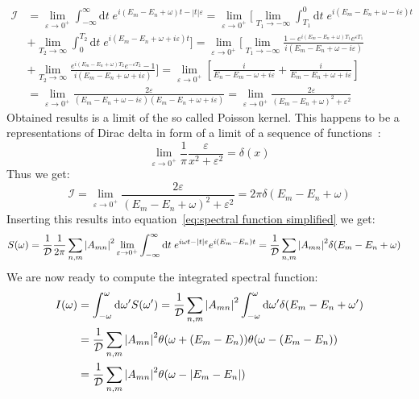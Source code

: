 \begin{align}
    \mathcal{I} &= \lim _{\varepsilon \to 0^+} \int_{-\infty}^{\infty} \mathrm{d} t \; 
    e^{ i (E_m-E_n+\omega)t -|t| \varepsilon} = \lim _{\varepsilon \to 0^+} 
    \Bigg[\lim_{T_1\to -\infty}\int_{T_1}^{0} \mathrm{d} t \; e^{ i (E_m-E_n+\omega -i \varepsilon)t}\nonumber\\
    &+\lim_{T_2\to \infty}\int_{0}^{T_2} \mathrm{d} t \;  e^{ i (E_m-E_n+\omega + i\varepsilon)t}\Bigg]
    = \lim _{\varepsilon \to 0^+} \Bigg[\lim_{T_1\to -\infty} 
    \frac{1-e^{ i (E_m-E_n+\omega )T_1} e^{\varepsilon T_1}}{i (E_m-E_n+\omega -i \varepsilon)}\nonumber\\
     &+ \lim_{T_2\to \infty} \frac{e^{ i (E_m-E_n+\omega )T_2} e^{-\varepsilon T_2}-1}
    {i (E_m-E_n+\omega +i \varepsilon)}\Bigg]
    = \lim _{\varepsilon \to 0^+} \left[\frac{i}{E_n-E_m-\omega +i \varepsilon} + 
    \frac{i}{E_m-E_n+\omega +i \varepsilon} \right]\nonumber\\
     &= \lim _{\varepsilon \to 0^+}
    \frac{2\varepsilon}{(E_m-E_n+\omega -i \varepsilon)(E_m-E_n+\omega +i \varepsilon)}
    =\lim _{\varepsilon \to 0^+} \frac{2\varepsilon}{(E_m-E_n+\omega)^2 +\varepsilon^2}
\end{align}
Obtained results is a limit of the so called Poisson kernel. This happens to be
a representations of Dirac delta in form of a limit of a sequence of functions~\autocite{byron1992mathematics}:
\begin{equation}
    \lim _{\varepsilon \to 0^+} \frac{1}{\pi} \frac{\varepsilon}{x^2 +\varepsilon^2} = \delta(x) 
\end{equation}
Thus we get:
\begin{equation}
    \mathcal{I} = \lim _{\varepsilon \to 0^+} \frac{2\varepsilon}{(E_m-E_n+\omega)^2 +\varepsilon^2}
    = 2\pi \delta(E_m-E_n+\omega)
\end{equation}
Inserting this results into equation~\eqref{eq:spectral function simplified} we get:
\begin{align}
    S(\omega) &= \frac{1}{\mathcal{D}} \frac{1}{2 \pi}\sum_{n,m} \abs{A_{mn}}^2  
    \lim _{\varepsilon \to 0^+} \int_{-\infty}^{\infty} \mathrm{d} t \; e^{i \omega t-|t| 
    \varepsilon}e^{i (E_m-E_n) t} = \frac{1}{\mathcal{D}}\sum_{n,m} \abs{A_{mn}}^2 \delta(E_m-E_n+\omega)
\end{align}
We are now ready to compute the integrated spectral function:
\begin{align}
    I(\omega) &= \int_{-\omega}^{\omega} \mathrm{d}\omega^{\prime} S(\omega^{\prime}) =
    \frac{1}{\mathcal{D}}\sum_{n,m} \abs{A_{mn}}^2 \int_{-\omega}^{\omega} \mathrm{d}\omega^{\prime} 
    \delta(E_m-E_n+\omega^{\prime}) \nonumber \\ &= \frac{1}{\mathcal{D}}\sum_{n,m} \abs{A_{mn}}^2
    \theta(\omega + (E_m-E_n))\theta(\omega - (E_m-E_n)) \nonumber\\
    &= \frac{1}{\mathcal{D}}\sum_{n,m} \abs{A_{mn}}^2\theta(\omega - \abs{E_m-E_n})
\end{align}


